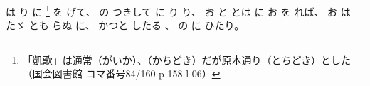 %
は
り
に
\footnote{「凱歌」は通常（がいか）、（かちどき）だが原本通り（とちどき）とした
（国会図書館 コマ番号84/160 p-158 l-06）}%
を%
げて、
%
の
つきして
に
り
り、
%
お
と
とは
に
お
を
れば、
%
お
は
たゞ%
とも
らぬ
に、%
%
かつと
したる
、
%
の
に
ひたり。%
